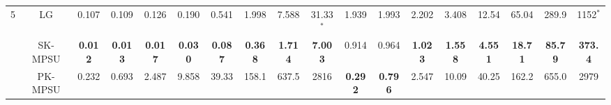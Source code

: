 \begin{table}[p]
\begin{adjustbox}{angle=90,center,scale=0.85}
\begin{tabular}{|c|c|c|c|c|c|c|c|c|c|c|c|c|c|c|c|c|c|}
\multirow{3}{*}{5}  
 & LG & \multicolumn{1}{c|}{0.107} & \multicolumn{1}{c|}{0.109} & \multicolumn{1}{c|}{0.126} & \multicolumn{1}{c|}{0.190} & \multicolumn{1}{c|}{0.541} & \multicolumn{1}{c|}{1.998} & \multicolumn{1}{c|}{7.588} & \multicolumn{1}{c|}{31.33$^*$} & \multicolumn{1}{c|}{1.939} & \multicolumn{1}{c|}{1.993} & \multicolumn{1}{c|}{2.202} & \multicolumn{1}{c|}{3.408} & \multicolumn{1}{c|}{12.54} & \multicolumn{1}{c|}{65.04} & \multicolumn{1}{c|}{289.9} & \multicolumn{1}{c|}{1152$^*$} \\ \cline{2-18} 
 & SK-MPSU & \multicolumn{1}{c|}{\textbf{0.012}} & \multicolumn{1}{c|}{\textbf{0.013}} & \multicolumn{1}{c|}{\textbf{0.017}} & \multicolumn{1}{c|}{\textbf{0.030}} & \multicolumn{1}{c|}{\textbf{0.087}} & \multicolumn{1}{c|}{\textbf{0.368}} & \multicolumn{1}{c|}{\textbf{1.714}} & \multicolumn{1}{c|}{\textbf{7.003}} & \multicolumn{1}{c|}{0.914} & \multicolumn{1}{c|}{0.964} & \multicolumn{1}{c|}{\textbf{1.023}} & \multicolumn{1}{c|}{\textbf{1.558}} & \multicolumn{1}{c|}{\textbf{4.551}} & \multicolumn{1}{c|}{\textbf{18.71}} & \multicolumn{1}{c|}{\textbf{85.79}} & \multicolumn{1}{c|}{\textbf{373.4}} \\ \cline{2-18} 
 & PK-MPSU & \multicolumn{1}{c|}{0.232} & \multicolumn{1}{c|}{0.693} & \multicolumn{1}{c|}{2.487} & \multicolumn{1}{c|}{9.858} & \multicolumn{1}{c|}{39.33} & \multicolumn{1}{c|}{158.1} & \multicolumn{1}{c|}{637.5} & \multicolumn{1}{c|}{2816} & \multicolumn{1}{c|}{\textbf{0.292}} & \multicolumn{1}{c|}{\textbf{0.796}} & \multicolumn{1}{c|}{2.547} & \multicolumn{1}{c|}{10.09} & \multicolumn{1}{c|}{40.25} & \multicolumn{1}{c|}{162.2} & \multicolumn{1}{c|}{655.0} & \multicolumn{1}{c|}{2979} \\ \hline


\end{tabular}
\end{adjustbox}
\end{table}
